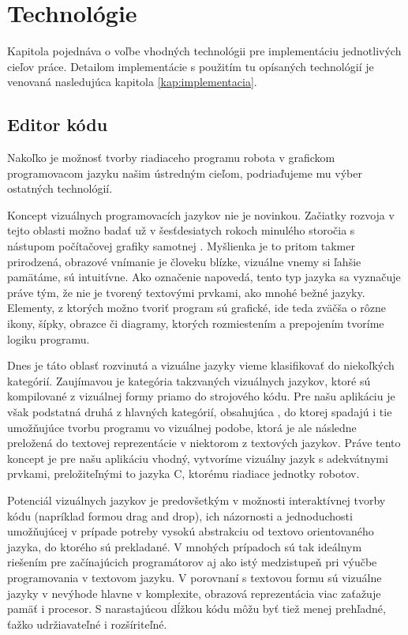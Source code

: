\chapter{Technológie}
\label{kap:technologie}

Kapitola pojednáva o voľbe vhodných technológii pre implementáciu jednotlivých cieľov práce. Detailom implementácie s použitím tu opísaných technológií je venovaná nasledujúca kapitola \ref{kap:implementacia}.

\section{Editor kódu}
\label{kap:GrafickyProgramovaciJayzk}
Nakoľko je možnosť tvorby riadiaceho programu robota v grafickom programovacom jazyku našim ústredným cieľom, podriaďujeme mu výber ostatných technológií.

Koncept vizuálnych programovacích jazykov nie je novinkou. Začiatky rozvoja v tejto oblasti možno badať už v šesťdesiatych rokoch minulého storočia s nástupom počítačovej grafiky samotnej \cite{boshernitsan2004visual}. Myšlienka je to pritom takmer prirodzená, obrazové vnímanie je človeku blízke, vizuálne vnemy si ľahšie pamätáme, sú intuitívne. Ako označenie napovedá, tento typ jazyka sa vyznačuje práve tým, že nie je tvorený textovými prvkami, ako mnohé bežné jazyky. Elementy, z ktorých možno tvoriť program sú grafické, ide teda zväčša o rôzne ikony, šípky, obrazce či diagramy, ktorých rozmiestením a prepojením tvoríme logiku programu.

Dnes je táto oblasť rozvinutá a vizuálne jazyky vieme klasifikovať do niekoľkých kategórií. Zaujímavou je kategória takzvaných  vizuálnych jazykov, ktoré sú kompilované z vizuálnej formy priamo do strojového kódu. Pre našu aplikáciu je však podstatná druhá z hlavných kategórií, obsahujúca , do ktorej spadajú i tie umožňujúce tvorbu programu vo vizuálnej podobe, ktorá je ale následne preložená do textovej reprezentácie v niektorom z textových jazykov. Práve tento koncept je pre našu aplikáciu vhodný, vytvoríme vizuálny jazyk s adekvátnymi prvkami, preložiteľnými to jazyka C, ktorému  riadiace jednotky robotov.

Potenciál vizuálnych jazykov je predovšetkým v možnosti interaktívnej tvorby kódu (napríklad formou drag and drop), ich názornosti a jednoduchosti umožňujúcej v prípade potreby vysokú abstrakciu od textovo orientovaného jazyka, do ktorého sú prekladané. V mnohých prípadoch sú tak ideálnym riešením pre začínajúcich programátorov aj ako istý medzistupeň pri výučbe programovania v textovom jazyku. V porovnaní s textovou formu sú vizuálne jazyky v nevýhode hlavne v komplexite, obrazová reprezentácia viac zaťažuje pamäť i procesor. S narastajúcou dĺžkou kódu môžu byť tiež menej prehľadné, ťažko udržiavateľné i rozšíriteľné.

